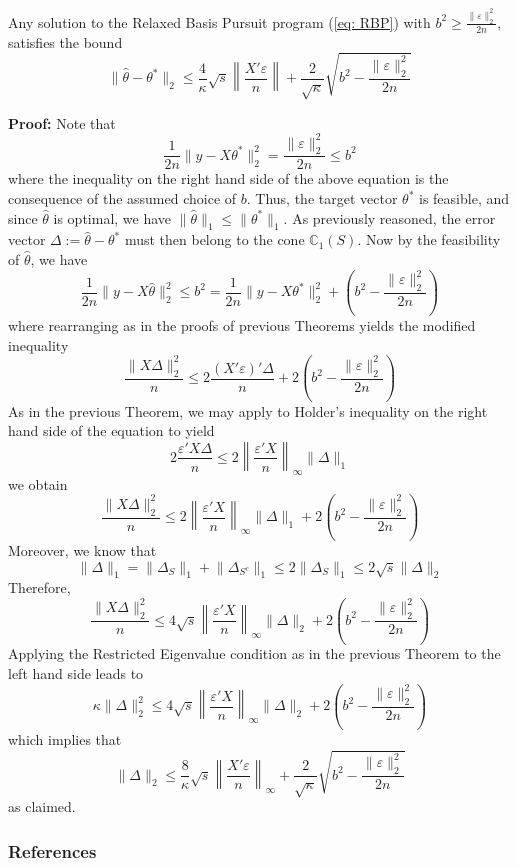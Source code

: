 \documentclass[10pt,handout,english]{beamer}
\newcommand{\C}{\mathbb{C}}
\begin{document}
\begin{frame}[allowframebreaks]
\begin{theorem}
Any solution to the Relaxed Basis Pursuit program (\ref{eq: RBP}) with $b^2\geq \frac{\lVert\varepsilon\rVert_2^2}{2n}$, satisfies the bound
\[
\lVert \hat{\theta}-\theta^*\rVert_2\leq\frac{4}{\kappa}\sqrt{s}\left\lVert\frac{X'\varepsilon}{n}\right\rVert+\frac{2}{\sqrt{\kappa}}\sqrt{b^2- \frac{\lVert\varepsilon\rVert_2^2}{2n}}
\]
\end{theorem}
\noindent\textbf{Proof:} Note that
\[
\frac{1}{2n}\lVert y-X\theta^*\rVert_2^2=\frac{\lVert\varepsilon\rVert_2^2}{2n}\leq b^2
\]
where the inequality on the right hand side of the above equation is the consequence of the assumed choice of $b$. Thus, the target vector $\theta^*$ is feasible, and since $\hat{\theta}$ is optimal, we have $\lVert\hat{\theta}\rVert_1\leq\lVert\theta^*\rVert_1$. As previously reasoned, the error vector $\Delta:=\hat{\theta}-\theta^*$ must then belong to the cone $\C_1(S)$. Now by the feasibility of $\hat{\theta}$, we have
\[
\frac{1}{2n}\lVert y-X\hat{\theta}\rVert_2^2\leq b^2=\frac{1}{2n}\lVert y-X\theta^*\rVert_2^2+\left(b^2-\frac{ \lVert\varepsilon\rVert_2^2}{2n} \right)
\]
where rearranging as in the proofs of previous Theorems yields the modified inequality
\[
\frac{\lVert X\Delta\rVert_2^2}{n}\leq2\frac{(X'\varepsilon)'\Delta}{n}+2\left(b^2-\frac{\lVert\varepsilon\rVert_2^2}{2n}\right)
\]
As in the previous Theorem, we may apply to Holder's inequality on the right hand side of the equation to yield
\[
2\frac{\varepsilon'X\Delta}{n}\leq2\left\lVert\frac{\varepsilon'X}{n}\right\rVert_{\infty}\lVert \Delta\rVert_1
\]
we obtain
\[
\frac{\lVert X\Delta\rVert_2^2}{n}\leq2\left\lVert\frac{\varepsilon'X}{n}\right\rVert_{\infty}\lVert \Delta\rVert_1+2\left(b^2-\frac{\lVert\varepsilon\rVert_2^2}{2n}\right)
\]
Moreover, we know that
\[
\lVert\Delta\rVert_1=\lVert\Delta_S\rVert_1+\lVert\Delta_{S^c}\rVert_1\leq 2\lVert\Delta_S\rVert_1\leq2\sqrt{s}\lVert\Delta\rVert_2
\]
Therefore,
\[
\frac{\lVert X\Delta\rVert_2^2}{n}\leq4\sqrt{s}\left\lVert\frac{\varepsilon'X}{n}\right\rVert_{\infty}\lVert \Delta\rVert_2+2\left(b^2-\frac{\lVert\varepsilon\rVert_2^2}{2n}\right)
\]
Applying the Restricted Eigenvalue condition as in the previous Theorem to the left hand side leads to
\[
\kappa\lVert\Delta\rVert_2^2\leq4\sqrt{s}\left\lVert\frac{\varepsilon'X}{n}\right\rVert_{\infty}\lVert \Delta\rVert_2+2\left(b^2-\frac{\lVert\varepsilon\rVert_2^2}{2n}\right)
\]
which implies that
\[
\lVert\Delta\rVert_2\leq\frac{8}{\kappa}\sqrt{s}\left\lVert\frac{X'\varepsilon}{n}\right\rVert_{\infty}+\frac{2}{\sqrt{\kappa}}\sqrt{b^2-\frac{\lVert\varepsilon\rVert_2^2}{2n}}
\]
as claimed.
\end{frame}

\begin{frame}[allowframebreaks]
\frametitle{References}


\end{frame}
\end{document}
